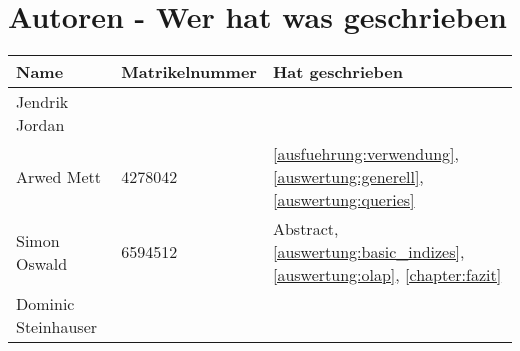 \chapter{Autoren - Wer hat was geschrieben}
\begin{table}[H]
	\centering
	\begin{tabularx}{\textwidth}{llX}
		\toprule
		Name                &	Matrikelnummer  & Hat geschrieben \\
		\toprule
		Jendrik Jordan      &                   & \\
		Arwed Mett          &   4278042         & \autoref{ausfuehrung:verwendung}, \autoref{auswertung:generell}, \autoref{auswertung:queries} \\
		Simon Oswald        &   6594512         & Abstract, \autoref{auswertung:basic_indizes}, \autoref{auswertung:olap}, \autoref{chapter:fazit} \\
		Dominic Steinhauser &                   & \\
		\bottomrule
	\end{tabularx}
	\label{tab:autoren}
\end{table}

